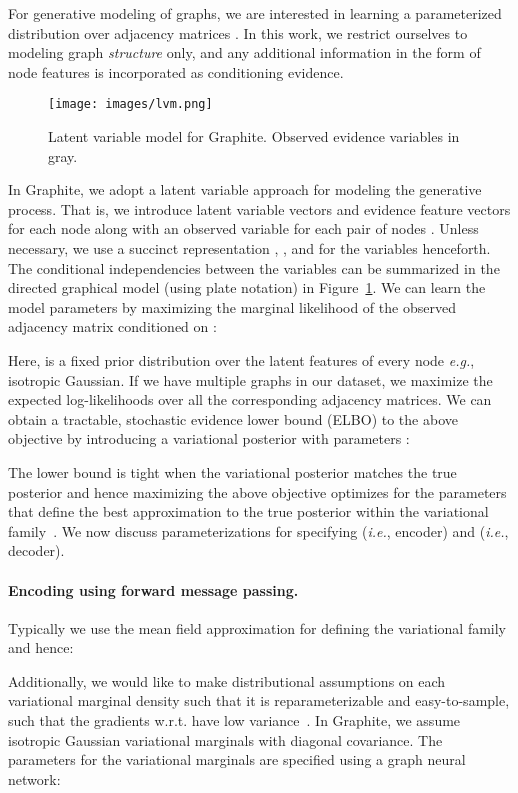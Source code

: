 \documentclass{article}
\newcommand{\name}{Graphite}
\begin{document}
For generative modeling of graphs, we are interested in learning a parameterized distribution over adjacency matrices . In this work, we restrict ourselves to modeling graph \textit{structure} only, and any additional information in the form of node features  is incorporated as conditioning evidence.

\begin{figure}[t]
\centering
\texttt{[image: images/lvm.png]}
\caption{Latent variable model for \name{}. Observed evidence variables in gray.}\label{fig:lvm}
\end{figure}
In \name{}, we adopt a latent variable approach for modeling the generative process. That is, we introduce latent variable vectors  and evidence feature vectors 
 for each node  along with an observed variable for each pair of nodes . Unless necessary, we use a succinct representation , , and  for the variables henceforth. 
The conditional independencies between the variables can be summarized in the directed graphical model (using plate notation) in Figure~\ref{fig:lvm}. We can learn the model parameters  by maximizing the marginal likelihood of the observed adjacency matrix conditioned on :


Here,  is a fixed prior distribution over the latent features of every node \textit{e.g.}, isotropic Gaussian.
If we have multiple graphs in our dataset, we maximize the expected log-likelihoods over all the corresponding adjacency matrices. We can obtain a tractable, stochastic evidence lower bound (ELBO) to the above objective by
introducing a variational posterior  with parameters : 


The lower bound is tight when the variational posterior  matches the true posterior  and hence maximizing the above objective optimizes for the parameters that define the best approximation to the true posterior within the variational family~\citep{blei2017variational}.
We now discuss parameterizations for specifying   (\textit{i.e.}, encoder) and  (\textit{i.e.}, decoder).


\paragraph{Encoding using forward message passing.}

Typically we use the mean field approximation for defining the variational family and hence:

Additionally, we would like to make distributional assumptions on each variational marginal density  such that it is reparameterizable and easy-to-sample, such that the gradients w.r.t.  have low variance~\citep{kingma2013auto}. In \name{}, we assume isotropic Gaussian variational marginals with diagonal covariance.
The parameters for the variational marginals  are specified using a graph neural network: 
\end{document}
